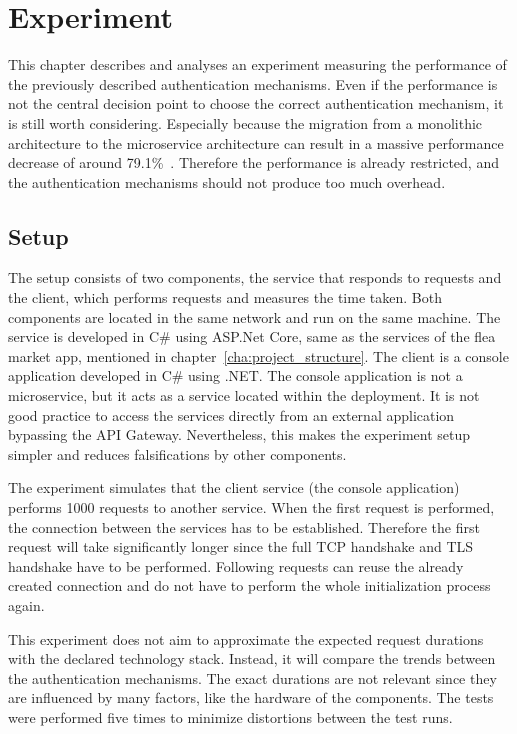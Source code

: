 \chapter{Experiment}
\label{cha:experiment}
This chapter describes and analyses an experiment measuring the performance of the previously described authentication mechanisms.
Even if the performance is not the central decision point to choose the correct authentication mechanism, it is still worth considering.
Especially because the migration from a monolithic architecture to the microservice architecture can result in a massive performance decrease of around 79.1\%~\cite{ueda2016workload}.
Therefore the performance is already restricted, and the authentication mechanisms should not produce too much overhead.

\section{Setup}
The setup consists of two components, the service that responds to requests and the client, which performs requests and measures the time taken.
Both components are located in the same network and run on the same machine.
The service is developed in C\# using ASP.Net Core, same as the services of the flea market app, mentioned in chapter~\ref{cha:project_structure}.
The client is a console application developed in C\# using .NET.
The console application is not a microservice, but it acts as a service located within the deployment.
It is not good practice to access the services directly from an external application bypassing the API Gateway.
Nevertheless, this makes the experiment setup simpler and reduces falsifications by other components. 

The experiment simulates that the client service (the console application) performs 1000 requests to another service.
When the first request is performed, the connection between the services has to be established.
Therefore the first request will take significantly longer since the full TCP handshake and TLS handshake have to be performed.
Following requests can reuse the already created connection and do not have to perform the whole initialization process again.

This experiment does not aim to approximate the expected request durations with the declared technology stack.
Instead, it will compare the trends between the authentication mechanisms.
The exact durations are not relevant since they are influenced by many factors, like the hardware of the components.
The tests were performed five times to minimize distortions between the test runs.

